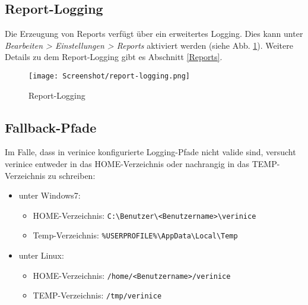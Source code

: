 \documentclass[a4paper,10pt]{book}
\begin{document}
\subsection{Report-Logging}
\label{sec:report-logging}

Die Erzeugung von Reports verfügt über ein erweitertes Logging. Dies
kann unter \textit{Bearbeiten > Einstellungen > Reports} aktiviert
werden (siehe Abb. \ref{fig:report-logging}). Weitere Details zu dem
Report-Logging gibt es Abschnitt \ref{Reports}.

\begin{figure}[ht]
  \centering
  \texttt{[image: Screenshot/report-logging.png]}
  \caption{Report-Logging}
  \label{fig:report-logging}
\end{figure}

\subsection{Fallback-Pfade}
\label{fallback-logging}

Im Falle, dass in verinice konfigurierte Logging-Pfade nicht valide
sind, versucht verinice entweder in das HOME-Verzeichnis oder
nachrangig in das TEMP-Verzeichnis zu schreiben:

\begin{itemize}

\item unter Windows7:

  \begin{itemize}
  \item HOME-Verzeichnis:
    \texttt{C:\textbackslash Benutzer\textbackslash <Benutzername>\textbackslash verinice}
  \item Temp-Verzeichnis:
    \texttt{\%USERPROFILE\%\textbackslash AppData\textbackslash Local\textbackslash Temp}
  \end{itemize}

\item unter Linux:
  \begin{itemize}
  \item HOME-Verzeichnis: \texttt{/home/<Benutzername>/verinice}
  \item TEMP-Verzeichnis: \texttt{/tmp/verinice}
  \end{itemize}
\end{itemize}
\end{document}
